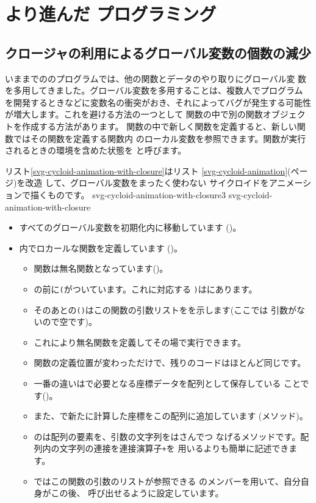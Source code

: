 \section{より進んだ \JS プログラミング}
\subsection{クロージャの利用によるグローバル変数の個数の減少}
いままでの\JS のプログラムでは、他の関数とデータのやり取りにグローバル変
数を多用してきました。グローバル変数を多用することは、複数人でプログラム
を開発するときなどに変数名の衝突がおき、それによってバグが発生する可能性
が増大します。これを避ける方法の一つとして%
関数の中で別の関数オブジェクトを作成する方法があります。
関数の中で新しく関数を定義すると、新しい関数ではその関数を定義する関数内
のローカル変数を参照できます。関数が実行されるときの環境を含めた状態を
と呼びます。

リスト\ref{svg-cycloid-animation-with-closure}はリスト
\ref{svg-cycloid-animation}(\pageref{svg-cycloid-animation}ページ)を改造
して、グローバル変数をまったく使わない
サイクロイドをアニメーションで描くものです。
{svg-cycloid-animation-with-closure3}
{svg-cycloid-animation-with-closure}
\begin{itemize}
 \item すべてのグローバル変数を初期化内に移動しています
       ()。
 \item {}内でロカールな関数を定義しています
			 ()。
\begin{itemize}
 \item 関数は無名関数となっています()。
 \item {}の前に\texttt{(}がついています。これに対応する
			 \texttt{)}はにあります。
 \item そのあとの\texttt{()}はこの関数の引数リストをを示します(ここでは
			 引数がないので空です)。
 \item これにより無名関数を定義してその場で実行できます。
 \item 関数の定義位置が変わっただけで、残りのコードはほとんど同じです。
 \item 一番の違いはで必要となる座標データを配列として保存している
			 ことです()。
 \item また、で新たに計算した座標をこの配列に追加しています
			 (メソッド)。
 \item {}のは配列の要素を、引数の文字列をはさんでつ
       なげるメソッドです。配列内の文字列の連接を連接演算子\texttt{+}を
       用いるよりも簡単に記述できます。
 \item {}ではこの関数の引数のリストが参照できる
			 のメンバーを用いて、自分自身がこの後、
			 呼び出せるように設定しています。
\end{itemize}

\end{itemize}
\iffalse

